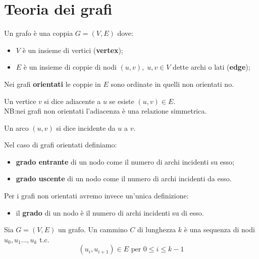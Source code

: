 \section{Teoria dei grafi}
\begin{definizione}[Grafo]
    Un grafo è una coppia \(G=(V,E)\) dove:
    \begin{itemize}
        \item \(V\) è un insieme di vertici (\textbf{vertex});
        \item \(E\) è un insieme di coppie di nodi \((u,v),\;u,v\in V\) dette archi o lati (\textbf{edge});
    \end{itemize}
    Nei grafi \textbf{orientati} le coppie in \(E\) sono ordinate in quelli non orientati no.
\end{definizione}

\begin{definizione}[Adiacenza]
    Un vertice \(v\) si dice adiacente a \(u\) se esiste \((u,v) \in E\). \\
    NB:\@ nei grafi non orientati l'adiacenza è una relazione simmetrica.
\end{definizione}

\begin{definizione}[Incidente]
    Un arco \((u,v)\) si dice incidente da \(u\) a \(v\).
\end{definizione}

\begin{definizione}[Grado]
    Nel caso di grafi orientati definiamo:
    \begin{itemize}
        \item \textbf{grado entrante} di un nodo come il numero di archi incidenti su esso;
        \item \textbf{grado uscente} di un nodo come il numero di archi incidenti da esso.
    \end{itemize}
    Per i grafi non orientati avremo invece un'unica definizione:
    \begin{itemize}
        \item il \textbf{grado} di un nodo è il numero di archi incidenti su di esso.
    \end{itemize}
\end{definizione}

\begin{definizione}[Cammino]
    Sia \(G=(V,E)\) un grafo. Un cammino \(C\) di lunghezza \(k\) è una sequenza di nodi \(u_0,u_1 \dots, u_k\) t.c.
    \begin{equation}
        (u_i,u_{i+1})\in E \text{ per } 0 \leq i \leq k-1
    \end{equation}
\end{definizione}

